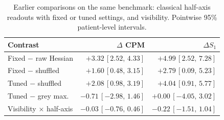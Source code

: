 \begin{table}[!t]
\centering
\footnotesize
\setlength{\tabcolsep}{2pt}
\small
\caption{Earlier comparisons on the same benchmark: classical half-axis readouts with fixed or tuned settings, and visibility. Pointwise 95\% patient-level intervals.}
\label{tab:historical}
\begin{tabular}{@{}lrr@{}}
\toprule
Contrast & $\Delta$ CPM & $\Delta S_1$ \\
\midrule
Fixed $-$ raw Hessian & $+3.32\,[2.52,\,4.33]$ & $+4.99\,[2.52,\,7.28]$ \\
Fixed $-$ shuffled & $+1.60\,[0.48,\,3.15]$ & $+2.79\,[0.09,\,5.23]$ \\
Tuned $-$ shuffled & $+2.08\,[0.98,\,3.19]$ & $+4.04\,[0.91,\,5.77]$ \\
Tuned $-$ grey max. & $-0.71\,[-2.98,\,1.46]$ & $+0.00\,[-4.05,\,3.02]$ \\
Visibility $\times$ half-axis & $-0.03\,[-0.76,\,0.46]$ & $-0.22\,[-1.51,\,1.04]$ \\
\bottomrule
\end{tabular}
\end{table}

